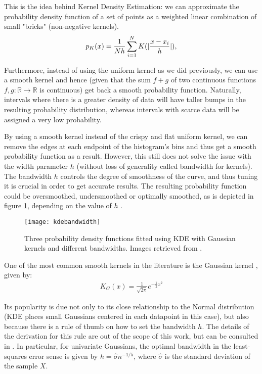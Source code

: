 \documentclass[../main.tex]{subfiles}
\begin{document}
\par This is the idea behind Kernel Density Estimation: we can approximate the probability density function of a set of points as a weighted linear combination of small "bricks" (non-negative kernels). 
\begin{align*}
p_K(x) = \frac{1}{Nh}\sum_{i=1}^NK(\lvert\frac{x - x_i}{h}\rvert),\\
\end{align*}
\par Furthermore, instead of using the uniform kernel as we did previously, we can use a smooth kernel and hence (given that the sum $f+g$ of two continuous functions $f, g: \mathbb{R} \rightarrow \mathbb{R}$ is continuous) get back a smooth probability function. Naturally, intervals where there is a greater density of data will have taller bumps in the resulting probability distribution, whereas intervals with scarce data will be assigned a very low probability.  
\par By using a smooth kernel instead of the crispy and flat uniform kernel, we can remove the edges at each endpoint of the histogram's bins and thus get a smooth probability function as a result. However, this still does not solve the issue with the width parameter $h$ (without loss of generality called bandwidth for kernels). The bandwidth $h$ controls the degree of smoothness of the curve, and thus tuning it is crucial in order to get accurate results. The resulting probability function could be oversmoothed, undersmoothed or optimally smoothed, as is depicted in figure \ref{fig_kdebandwidths}, depending on the value of $h$ \cite{Duong2004}.
\begin{figure}[t]
\centering
\texttt{[image: kdebandwidth]}
\caption{Three probability density functions fitted using KDE with Gaussian kernels and different bandwidths. Images retrieved from \cite{Duong2004}.}
\label{fig_kdebandwidths}
\end{figure}
\par One of the most common smooth kernels in the literature is the Gaussian kernel \cite{hastie2008}, given by:
\begin{align*}
K_G(x) = \frac{1}{\sqrt{2\pi}}e^{-\frac{1}{2}x^2}
\end{align*}
\par Its popularity is due not only to its close relationship to the Normal distribution (KDE places small Gaussians centered in each datapoint in this case), but also because there is a rule of thumb on how to set the bandwidth $h$. The details of the derivation for this rule are out of the scope of this work, but can be consulted in \cite{Hansen2009}. In particular, for univariate Gaussians, the optimal bandwidth in the least-squares error sense is given by $h = \hat{\sigma}n^{-1/5}$, where $\hat{\sigma}$ is the standard deviation of the sample $X$.
\end{document}
